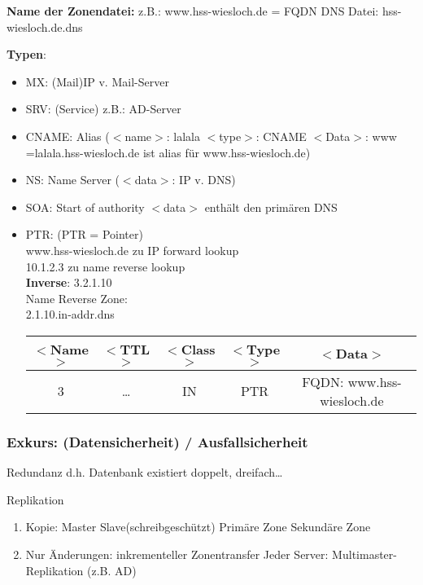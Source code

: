 \documentclass[asp1.tex]{subfiles}
\begin{document}
\textbf{Name der Zonendatei:}
z.B.: www.hss-wiesloch.de = FQDN
\textrightarrow\space DNS \textrightarrow\space Datei: hss-wiesloch.de.dns



\textbf{Typen}:
\begin{itemize}
    \item MX: (Mail)IP v. Mail-Server
    \item SRV: (Service) z.B.: AD-Server
    \item CNAME: Alias (\(<\)name\(>\): lalala \(<\)type\(>\): CNAME \(<\)Data\(>\): www     =\textrightarrow\space lalala.hss-wiesloch.de ist alias für www.hss-wiesloch.de)
    \item NS: Name Server (\(<\)data\(>\): IP v. DNS)
    \item SOA: Start of authority \textrightarrow\space \(<\)data\(>\) enthält den primären DNS
    \item PTR: (PTR = Pointer)\\
    	www.hss-wiesloch.de  zu IP \textrightarrow\space forward lookup\\
    	10.1.2.3 zu name \textrightarrow\space reverse lookup\\
    	\textbf{Inverse}: 3.2.1.10\\
    Name Reverse Zone:\\
    	2.1.10.in-addr.dns\\
    	\begin{tabular}{|c|c|c|c|c|}
                \hline
                \(<\)Name\(>\)&\(<\)TTL\(>\)&\(<\)Class\(>\)&\(<\)Type\(>\)&\(<\)Data\(>\)\\\hline
                3&…&IN&PTR&FQDN: www.hss-wiesloch.de\\\hline
            \end{tabular}
\end{itemize}


\subsubsection{Exkurs: (Datensicherheit) / Ausfallsicherheit}

\textrightarrow\space Redundanz d.h. Datenbank existiert doppelt, dreifach…

\textrightarrow\space Replikation
\begin{enumerate}
    \item Kopie: Master \textrightarrow\space Slave(schreibgeschützt)
	             Primäre Zone \textrightarrow\space Sekundäre Zone
    \item Nur Änderungen: inkrementeller Zonentransfer
Jeder Server: Multimaster-Replikation (z.B. AD)
\end{enumerate}
\end{document}
